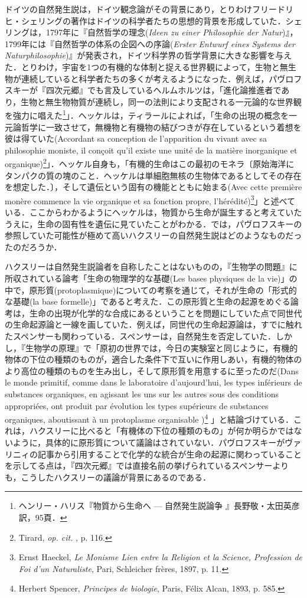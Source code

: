 ドイツの自然発生説は，ドイツ観念論がその背景にあり，とりわけフリードリヒ・シェリングの著作はドイツの科学者たちの思想的背景を形成していた．シェリングは，1797年に『自然哲学の理念(\emph{Ideen zu einer Philosophie der Natur})』，1799年には『自然哲学の体系の企図への序論(\emph{Erster Entwurf eines Systems der Naturphilosophie})』が発表され，ドイツ科学界の哲学背景に大きな影響を与えた．とりわけ，宇宙を1つの有機的な体制と捉える世界観によって，生物と無生物が連続していると科学者たちの多くが考えるようになった．例えば，パヴロフスキーが『四次元郷』でも言及しているヘルムホルツは，「進化論推進者であり，生物と無生物物質が連続し，同一の法則により支配される一元論的な世界観を強力に唱えた\footnote{ヘンリー・ハリス『物質から生命へ --- 自然発生説論争 』長野敬・太田英彦訳，95頁．}」．ヘッケルは，ティラールによれば，「生命の出現の概念を一元論哲学に一致させて，無機物と有機物の結びつきが存在しているという着想を彼は得ていた(Accordant sa conception de l'apparition du vivant avec sa philosophie moniste, il conçoit qu'il existe une unité de la matière inorganique et organique)\footnote{Tirard, \emph{op. cit. }, p. 116.}」．ヘッケル自身も，「有機的生命はこの最初のモネラ〔原始海洋にタンパクの質の塊のこと．ヘッケルは単細胞無核の生物体であるとしてその存在を想定した．〕，そして遺伝という固有の機能とともに始まる(Avec cette première monère commence la vie organique et sa fonction propre, l'hérédité)\footnote{Ernst Haeckel, \emph{Le Monisme Lien entre la Religion et la Science, Profession de Foi d'un Naturaliste}, Pari, Schleicher frères, 1897, p. 11.}」と述べている．ここからわかるようにヘッケルは，物質から生命が誕生すると考えていたうえに，生命の固有性を遺伝に見ていたことがわかる．では，パヴロフスキーの参照していた可能性が極めて高いハクスリーの自然発生説はどのようなものだったのだろうか．

ハクスリーは自然発生説論者を自称したことはないものの，『生物学の問題』に所収されている論考「生命の物理学的な基礎(Les bases physiques de la vie)」の中で，原形質(protoplasmique)についての考察を通じて，それが生命の「形式的な基礎(la base formelle)」であると考えた．この原形質と生命の起源をめぐる論考は，生命の出現が化学的な合成にあるということを問題にしていた点で同世代の生命起源論と一線を画していた．例えば，同世代の生命起源論は，すでに触れたスペンサーも関わっている．スペンサーは，自然発生を否定していた．しかし，『生物学の原理』で「原初の世界では，今日の実験室と同じように，有機的物体の下位の種類のものが，適合した条件下で互いに作用しあい，有機的物体のより高位の種類のものを生み出し，そして原形質を用意するに至ったのだ(Dans le monde primitif, comme dans le laboratoire d'aujourd'hui, les types inférieurs de substances organiques, en agissant les uns sur les autres sous des conditions appropriées, ont produit par évolution les types supérieurs de substances organiques, aboutissant à un protoplasme organisable )\footnote{Herbert Spencer, \emph{Principes de biologie}, Paris, Félix Alcan, 1893, p. 585.} 」と結論づけている．これは，ハクスリーに比べると「有機体の下位の種類のもの」が何か明らかではないように，具体的に原形質について議論はされていない．パヴロフスキーがヴァリニィの記事から引用することで化学的な統合が生命の起源に関わっていることを示してる点は，『四次元郷』では直接名前の挙げられているスペンサーよりも，こうしたハクスリーの議論が背景にあるのである．

